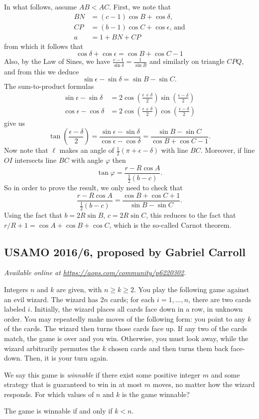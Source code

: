 \documentclass[11pt]{scrartcl}
\begin{document}
In what follows, assume $AB < AC$.
First, we note that
\begin{align*}
BN   &=   (c-1) \cos B + \cos \delta \textrm{,}    \\
CP   &=   (b-1) \cos C + \cos \epsilon \textrm{, and}   \\
a   &=   1 + BN + CP
\end{align*}
from which it follows that
\[
\cos \delta + \cos \epsilon = \cos B + \cos C - 1
\]
Also, by the Law of Sines, we have $\frac{c-1}{\sin\delta} = \frac{1}{\sin B}$
and similarly on triangle $CPQ$, and from this we deduce
\[ \sin \epsilon - \sin \delta = \sin B - \sin C. \]
The sum-to-product formulas
\begin{align*}
\sin{\epsilon} - \sin{\delta} &= 2 \cos\left( \frac{\epsilon + \delta}{2} \right) \sin\left( \frac{\epsilon - \delta}{2} \right) \\
\cos{\epsilon} - \cos{\delta} &= 2 \cos\left( \frac{\epsilon + \delta}{2} \right) \cos\left( \frac{\epsilon - \delta}{2} \right)
\end{align*}
give us
\[
\tan \left( \frac{\epsilon-\delta}{2} \right) = \frac{\sin{\epsilon} - \sin{\delta}}{\cos{\epsilon} - \cos{\delta}}
= \frac{\sin B - \sin C}{\cos B + \cos C - 1}. \]
Now note that $\ell$ makes an angle of
$\frac{1}{2}(\pi+\epsilon-\delta)$ with line $BC$.
Moreover, if line $OI$ intersects line $BC$ with angle $\varphi$ then
\[ \tan\varphi = \frac{r - R \cos A}{\frac{1}{2}(b-c)}. \]
So in order to prove the result, we only need to check that
\[ \frac{r - R \cos A}{\frac{1}{2}(b-c)}
  = \frac{\cos B + \cos C + 1}{\sin B - \sin C}. \]
Using the fact that $b = 2R\sin B$, $c = 2R\sin C$, this  reduces to the fact that
$r/R + 1 = \cos A + \cos B + \cos C$, which is the so-called Carnot theorem.
\pagebreak

\subsection{USAMO 2016/6, proposed by Gabriel Carroll}
\textsl{Available online at \url{https://aops.com/community/p6220302}.}
\begin{mdframed}[style=mdpurplebox,frametitle={Problem statement}]
Integers $n$ and $k$ are given, with $n \ge k \ge 2$.
You play the following game against an evil wizard.
The wizard has $2n$ cards; for each $i=1,\dots,n$, there are two cards labeled $i$.
Initially, the wizard places all cards face down in a row, in unknown order.
You may repeatedly make moves of the following form: you point to any $k$ of the cards.
The wizard then turns those cards face up.
If any two of the cards match, the game is over and you win.
Otherwise, you must look away, while the wizard arbitrarily permutes
the $k$ chosen cards and then turns them back face-down. Then, it is your turn again.

We say this game is \emph{winnable} if there exist some positive integer $m$ and
some strategy that is guaranteed to win in at most $m$ moves,
no matter how the wizard responds.
For which values of $n$ and $k$ is the game winnable?
\end{mdframed}
The game is winnable if and only if $k < n$.
\end{document}
